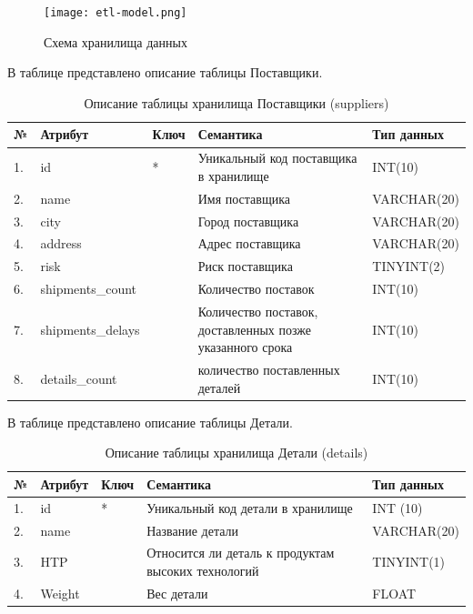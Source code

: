 \begin{figure}[h]
  \centering
  \texttt{[image: etl-model.png]}
  \caption{Схема хранилища данных}
  \label{etl-diagram}
\end{figure}

В таблице  представлено описание таблицы Поставщики.
\begin{table}[h]
	\caption{\space Описание таблицы хранилища Поставщики (suppliers)}
	\label{etl-suppliers}
	\begin{tabular}{|p{0.4cm}|p{2.5cm}|p{1.5cm}|p{6.3cm}|p{3.2cm}|}
		\hline
		\textbf{№} & \textbf{Атрибут} & \textbf{Ключ} & \textbf{Семантика} & \textbf{Тип данных} \\
		\hline
		1. & id & * & Уникальный код поставщика в хранилище & INT(10) \\
		\hline
		2. & name & & Имя поставщика & VARCHAR(20) \\
		\hline
		3. & city & & Город поставщика & VARCHAR(20) \\
		\hline
		4. & address & & Адрес поставщика & VARCHAR(20) \\
		\hline
		5. & risk & & Риск поставщика & TINYINT(2) \\
		\hline
		6. & shipments\_count & & Количество поставок & INT(10) \\
		\hline
		7. & shipments\_delays & & Количество поставок, доставленных позже указанного срока & INT(10) \\
		\hline
		8. & details\_count & & количество поставленных деталей & INT(10) \\
		\hline
	\end{tabular}
\end{table}

В таблице  представлено описание таблицы Детали.
\begin{table}[h]
	\caption{\space Описание таблицы хранилища Детали (details)}
	\label{etl-parts}
	\begin{tabular}{|p{0.4cm}|p{2.5cm}|p{1.5cm}|p{6.3cm}|p{3.2cm}|}
		\hline
		\textbf{№} & \textbf{Атрибут} & \textbf{Ключ} & \textbf{Семантика} & \textbf{Тип данных} \\
		\hline
		1. & id & * & Уникальный код детали в хранилище & INT (10) \\
		\hline
		2. & name & & Название детали & VARCHAR(20) \\
		\hline
		3. & HTP & & Относится ли деталь к продуктам высоких технологий & TINYINT(1) \\
		\hline
		4. & Weight & & Вес детали & FLOAT \\
		\hline
	\end{tabular}
\end{table}

